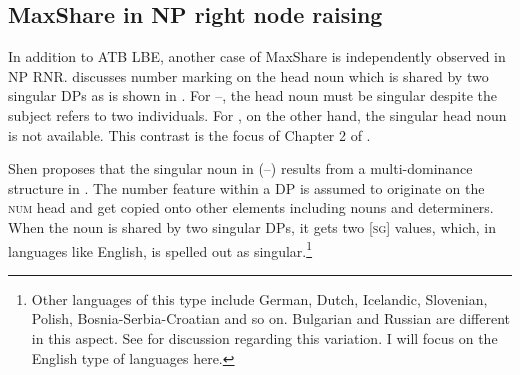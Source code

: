 \documentclass[output=paper]{langscibook}
\begin{document}
\subsection{MaxShare in NP right node raising}
\label{shensect:rnr}

In addition to ATB LBE, another case of MaxShare is independently observed in NP RNR.
\citet{Shen:2018a} discusses number marking on the head noun which is shared by two singular DPs as is shown in . 
For --, the head noun must be singular despite the subject refers to two individuals. 
For , on the other hand, the singular head noun is not available. 
This contrast is the focus of Chapter 2 of \citet{Shen:2018a}.

\ea 
	\label{shennrnr}
	\z 
\z 
{}
Shen proposes that the singular noun in (--) results from a multi-dominance structure in . The number feature within a DP is assumed to originate on the \textsc{num} head and get copied onto other elements including nouns and determiners. When the noun is shared by two singular DPs, it gets two [\textsc{sg}] values, which, in languages like English, is spelled out as singular.\footnote{Other languages of this type include German, Dutch, Icelandic, Slovenian, Polish, Bosnia-Serbia-Croatian and so on. Bulgarian and Russian are different in this aspect. See \citet{Shen:2019} for discussion regarding this variation. I will focus on the English type of languages here.} 


%
\end{document}
